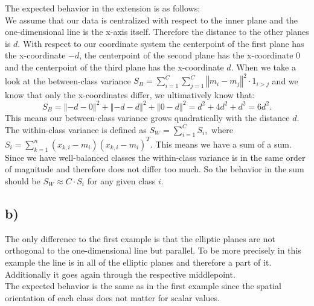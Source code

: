 \documentclass[paper=a4,fontsize=10pt,DIV11,BCOR10mm]{scrartcl}
\begin{document}
The expected behavior in the extension is as follows:\\
We assume that our data is centralized with respect to the inner plane and the one-dimensional line is the x-axis itself. Therefore the distance to the other planes is $d$. With respect to our coordinate system the centerpoint of the first plane has the x-coordinate $-d$, the centerpoint of the second plane has the x-coordinate $0$ and the centerpoint of the third plane has the x-coordinate $d$. When we take a look at the between-class variance \mbox{$S_B = \sum_{i=1}^C\sum_{j=1}^C\left\Vert m_i - m_j \right\Vert^2 \cdot 1_{i>j}$} and we know that only the x-coordinates differ, we ultimatively know that: \[S_B = \left\Vert -d - 0 \right\Vert^2 + \left\Vert -d - d \right\Vert^2 + \left\Vert 0 - d\right\Vert^2 = d^2 + 4d^2 + d^2 = 6d^2 .\] This means our between-class variance grows quadratically with the distance $d$.\\

The within-class variance is defined as \mbox{$S_W = \sum_{i=1}^C S_i$, where $S_i = \sum_{k=1}^n (x_{k,i} -m_i)(x_{k,i} - m_i)^T $}. This means we have a sum of a sum. Since we have well-balanced classes the within-class variance is in the same order of magnitude and therefore does not differ too much. So the behavior in the sum should be $S_W \approx C \cdot S_i$ for any given class $i$.

\subsection*{b)}
The only difference to the first example is that the elliptic planes are not orthogonal to the one-dimensional line but parallel. To be more precisely in this example the line is in all of the elliptic planes and therefore a part of it. Additionally it goes again through the respective middlepoint.\\

The expected behavior is the same as in the first example since the spatial orientation of each class does not matter for scalar values.
\end{document}
